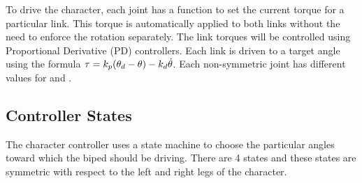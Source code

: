 To drive the character, each joint has a function to set the current torque for a particular link. 
This torque is automatically applied to both links without the need to enforce the rotation separately.
The link torques will be controlled using Proportional Derivative (PD) controllers.
Each link is driven to a target angle using the formula $\tau = k_{p}(\theta_{d}- \theta) - k_{d}\dot{\theta} $.
Each non-symmetric joint has different values for \Kp and \Kd.

\subsection{Controller States}

The character controller uses a state machine to choose the particular angles toward which the biped should be driving. 
There are 4 states and these states are symmetric with respect to the left and right legs of the character.

